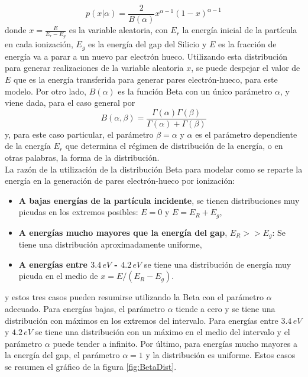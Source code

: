 \begin{equation*}
    p(x|\alpha) = \frac{2}{B(\alpha)} x^{\alpha - 1}(1-x)^{\alpha - 1}
\end{equation*}
donde $x = \frac{E}{E_{r} - E_{g}}$ es la variable aleatoria, con $E_{r}$ la energía inicial de la partícula en cada ionización, $E_{g}$ es la energía del gap del Silicio y $E$ es la fracción de energía va a parar a un nuevo par electrón hueco. Utilizando esta distribución para generar realizaciones de la variable aleatoria $x$, se puede despejar el valor de $E$ que es la energía transferida para generar pares electrón-hueco, para este modelo. Por otro lado, $B(\alpha)$ es la función Beta con un único parámetro $\alpha$, y viene dada, para el caso general por
\begin{equation*}
    B(\alpha, \beta) 
    = \frac{\Gamma(\alpha)\Gamma(\beta)}{\Gamma(\alpha) + \Gamma(\beta)}
\end{equation*}
y, para este caso particular, el parámetro $\beta = \alpha$ y $\alpha$ es el parámetro dependiente de la energía $E_{r}$ que determina el régimen de distribución de la energía, o en otras palabras, la forma de la distribución. \\
\indent La razón de la utilización de la distribución Beta para modelar como se reparte la energía en la generación de pares electrón-hueco por ionización:
\begin{itemize}
    \item \textbf{A bajas energías de la partícula incidente}, se tienen distribuciones muy picudas en los extremos posibles: $E = 0$ y $E = E_{R}+E_{g}$,
    \item \textbf{A energías mucho mayores que la energía del gap}, $E_{R} >> E_{g}$: Se tiene una distribución aproximadamente uniforme,
    \item \textbf{A energías entre $3.4\,eV$ - $4.2\,eV$ } se tiene una distribución de energía muy picuda en el medio de $x = E/(E_{R} - E_{g})$.
\end{itemize}
y estos tres casos pueden resumirse utilizando la Beta con el parámetro $\alpha$ adecuado. Para energías bajas, el parámetro $\alpha$ tiende a cero y se tiene una distribución con máximos en los extremos del intervalo. Para energías entre $3.4\,eV$ y $4.2\,eV$ se tiene una distribución con un máximo en el medio del intervalo y el parámetro $\alpha$ puede tender a infinito. Por último, para energías mucho mayores a la energía del gap, el parámetro $\alpha = 1$ y la distribución es uniforme. Estos casos se resumen el gráfico de la figura \ref{fig:BetaDist}.
